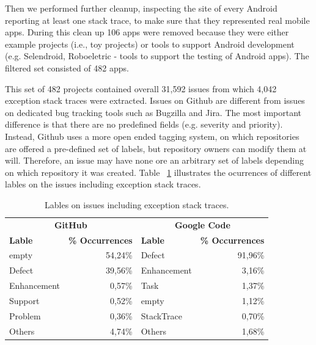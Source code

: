 \documentclass[conference]{IEEEtran}
\begin{document}
Then we performed further cleanup, inspecting the site of every Android
reporting at least one stack trace, to make sure that they represented real
mobile apps. During this clean up 106 apps were removed because they were either
example projects (i.e., toy projects) or tools to support Android development
(e.g. Selendroid, Roboeletric - tools to support the testing of Android apps).
The filtered set consisted of 482 apps. 




This set of 482 projects contained overall 31,592 issues from which 4,042 exception stack traces 
were extracted. Issues on Github are different from issues on dedicated bug tracking tools such as 
Bugzilla and Jira. The most important difference is that there are no predefined fields
  (e.g. severity and priority). Instead, Github uses a more open ended tagging system, on which
repositories are offered a pre-defined set of labels, but repository owners can modify 
them at will. Therefore, an issue may have none ore an arbitrary set of labels depending 
on which repository it was created. Table ~\ref{tab:lables} illustrates the ocurrences of different lables 
on the issues including exception stack traces.





\begin{table}
  \centering
  \begin{tabular}{lr|lr}
    \hline
     \multicolumn{2}{c}{\bfseries{GitHub}} &  \multicolumn{2}{c}{\bfseries{Google Code}} \\
      \bfseries{Lable} &  \bfseries{\% Occurrences} &  \bfseries{Lable} &  \bfseries{\% Occurrences} \\
    \hline
empty &	54,24\% & Defect &	91,96\% \\
Defect &	39,56\%  & Enhancement  &	3,16\% \\
Enhancement &	0,57\% & Task	& 1,37\% \\
Support &	0,52\% & empty &	1,12\% \\
Problem &	0,36\% & StackTrace &	0,70\% \\
Others &	4,74\% &  Others &	1,68\% \\   
  \hline
  \end{tabular}
  \caption{Lables on issues including exception stack traces.}
  \label{tab:lables}
\end{table}
\end{document}
